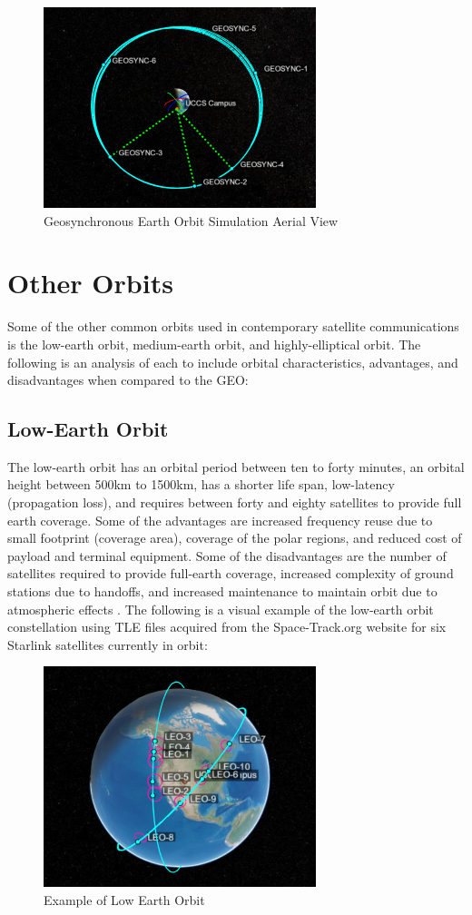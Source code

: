 \documentclass[conference]{IEEEtran}
\begin{document}
\begin{figure}[h]
\centerline{\includegraphics{constellation2copy.png}}
\caption{Geosynchronous Earth Orbit Simulation Aerial View}
\label{fig:4}
\end{figure}

\section{Other Orbits}
Some of the other common orbits used in contemporary satellite communications is the low-earth orbit, medium-earth orbit, and highly-elliptical orbit. The following is an analysis of each to include orbital characteristics, advantages, and disadvantages when compared to the GEO:

\subsection{Low-Earth Orbit}
The low-earth orbit has an orbital period between ten to forty minutes, an orbital height between 500km to 1500km, has a shorter life span, low-latency (propagation loss), and requires between forty and eighty satellites to provide full earth coverage. Some of the advantages are increased frequency reuse due to small footprint (coverage area), coverage of the polar regions, and reduced cost of payload and terminal equipment. Some of the disadvantages are the number of satellites required to provide full-earth coverage, increased complexity of ground stations due to handoffs, and increased maintenance to maintain orbit due to atmospheric effects \cite{b18}. The following is a visual example of the low-earth orbit constellation using TLE files acquired from the Space-Track.org website for six Starlink satellites currently in orbit:
\begin{figure}[h]
\centerline{\includegraphics{constellation3copy.png}}
\caption{Example of Low Earth Orbit}
\label{fig:5}
\end{figure}
\end{document}
